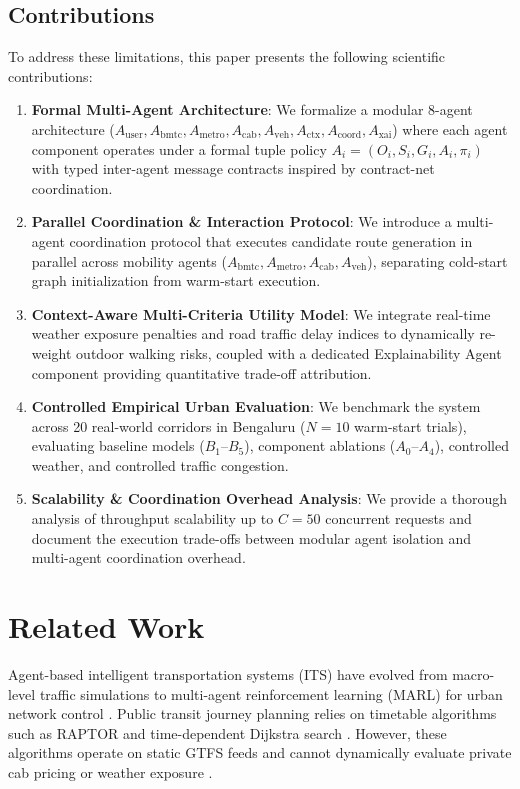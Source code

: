 \documentclass[runningheads]{llncs}
\begin{document}
\subsection{Contributions}
To address these limitations, this paper presents the following scientific contributions:
\begin{enumerate}
    \item \textbf{Formal Multi-Agent Architecture}: We formalize a modular 8-agent architecture ($A_{\text{user}}, A_{\text{bmtc}}, A_{\text{metro}}, A_{\text{cab}}, A_{\text{veh}}, A_{\text{ctx}}, A_{\text{coord}}, A_{\text{xai}}$) where each agent component operates under a formal tuple policy $A_i = (O_i, S_i, G_i, A_i, \pi_i)$ with typed inter-agent message contracts inspired by contract-net coordination.
    \item \textbf{Parallel Coordination \& Interaction Protocol}: We introduce a multi-agent coordination protocol that executes candidate route generation in parallel across mobility agents ($A_{\text{bmtc}}, A_{\text{metro}}, A_{\text{cab}}, A_{\text{veh}}$), separating cold-start graph initialization from warm-start execution.
    \item \textbf{Context-Aware Multi-Criteria Utility Model}: We integrate real-time weather exposure penalties and road traffic delay indices to dynamically re-weight outdoor walking risks, coupled with a dedicated Explainability Agent component providing quantitative trade-off attribution.
    \item \textbf{Controlled Empirical Urban Evaluation}: We benchmark the system across 20 real-world corridors in Bengaluru ($N=10$ warm-start trials), evaluating baseline models ($B_1$–$B_5$), component ablations ($A_0$–$A_4$), controlled weather, and controlled traffic congestion.
    \item \textbf{Scalability \& Coordination Overhead Analysis}: We provide a thorough analysis of throughput scalability up to $C=50$ concurrent requests and document the execution trade-offs between modular agent isolation and multi-agent coordination overhead.
\end{enumerate}


\section{Related Work}
\label{sec:related_work}

Agent-based intelligent transportation systems (ITS) have evolved from macro-level traffic simulations \cite{adler2002cooperative, bazzan2014review} to multi-agent reinforcement learning (MARL) for urban network control \cite{chen2021multi, zhang2024agentic}. Public transit journey planning relies on timetable algorithms such as RAPTOR \cite{delling2015round} and time-dependent Dijkstra search \cite{bast2016route, pyrga2008efficient}. However, these algorithms operate on static GTFS feeds and cannot dynamically evaluate private cab pricing or weather exposure \cite{sharma2023gtfs}.
\end{document}
